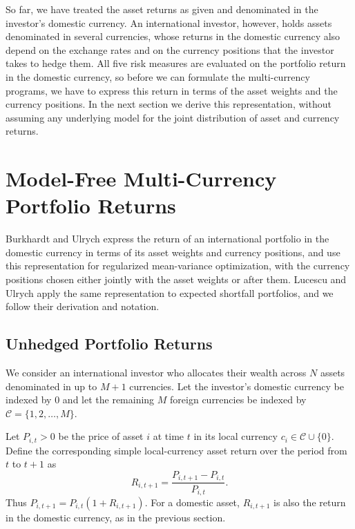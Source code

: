 So far, we have treated the asset returns as given and denominated in the investor's domestic currency. An
international investor, however, holds assets denominated in several currencies, whose returns in the domestic currency
also depend on the exchange rates and on the currency positions that the investor takes to hedge them. All five risk
measures are evaluated on the portfolio return in the domestic currency, so before we can formulate the multi-currency
programs, we have to express this return in terms of the asset weights and the currency positions. In the next section
we derive this representation, without assuming any underlying model for the joint distribution of asset and currency returns.

\section{Model-Free Multi-Currency Portfolio Returns}\label{sec:returns}

Burkhardt and Ulrych \cite{SparseAndStableInternationalPortfolioOptimization} express the return of an international
portfolio in the domestic currency in terms of its asset weights and currency positions, and use this representation for
regularized mean-variance optimization, with the currency positions chosen either jointly with the asset weights or after
them. Lucescu and Ulrych \cite{RegularizedMultiCurrencyExpectedShortfallPortfolios} apply the same representation to
expected shortfall portfolios, and we follow their derivation and notation.

\subsection{Unhedged Portfolio Returns}\label{sec:unhedged-returns}

We consider an international investor who allocates their wealth across $N$ assets denominated in up to $M+1$ currencies. Let the investor's domestic currency be indexed by $0$ and let the remaining $M$ foreign currencies be indexed by $\mathcal{C} = \{1,2,\dots,M\}$.

Let $P_{i,t}>0$ be the price of asset $i$ at time $t$ in its local currency $c_i \in \mathcal{C}\cup \{0\}$. Define the corresponding simple local-currency asset return over the period from $t$ to $t+1$ as
\begin{equation*}
R_{i,t+1} = \frac{P_{i,t+1}-P_{i,t}}{P_{i,t}}.
\end{equation*}
Thus $P_{i,t+1}=P_{i,t}(1+R_{i,t+1})$. For a domestic asset, $R_{i,t+1}$ is also the return in the domestic currency, as in the previous section.

